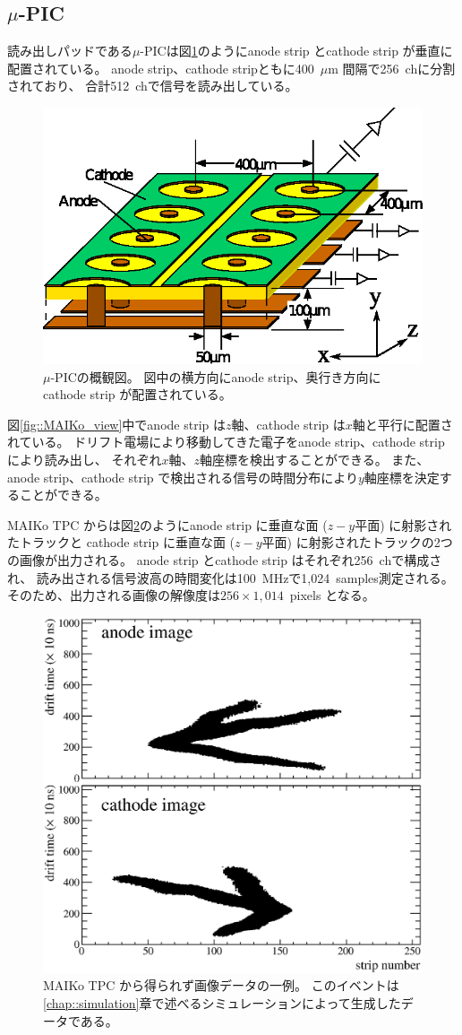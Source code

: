 \subsection{$\mu$-PIC}
読み出しパッドである$\mu$-PICは図\ref{fig::mupic}のようにanode strip とcathode strip が垂直に配置されている。
anode strip、cathode stripともに400~$\mu$m 間隔で256~chに分割されており、
合計512~chで信号を読み出している。
\begin{figure}
  \centering
  \includegraphics[clip, width=0.7\columnwidth]{eps/upic_struc_xyz.eps}
  \caption[$\mu$-PICの概観図。]{$\mu$-PICの概観図。
    図中の横方向にanode strip、奥行き方向にcathode strip が配置されている。
  }
  \label{fig::mupic}
\end{figure}
図\ref{fig::MAIKo_view}中でanode strip は$z$軸、cathode strip は$x$軸と平行に配置されている。
ドリフト電場により移動してきた電子をanode strip、cathode strip により読み出し、
それぞれ$x$軸、$z$軸座標を検出することができる。
また、anode strip、cathode strip で検出される信号の時間分布により$y$軸座標を決定することができる。

MAIKo TPC からは図\ref{fig::track_demo}のようにanode strip に垂直な面 ($z-y$平面) に射影されたトラックと
cathode strip に垂直な面 ($z-y$平面) に射影されたトラックの2つの画像が出力される。
anode strip とcathode strip はそれぞれ256~chで構成され、
読み出される信号波高の時間変化は100~MHzで1,024~samples測定される。
そのため、出力される画像の解像度は$256\times1,014$~pixels となる。
\begin{figure}
  \centering
  \includegraphics[clip, width=0.7\columnwidth]{eps/10016_6.eps}
  \caption[MAIKo TPC から得られず画像データの一例。]
          {MAIKo TPC から得られず画像データの一例。
          このイベントは\ref{chap::simulation}章で述べるシミュレーションによって生成したデータである。}
  \label{fig::track_demo}
\end{figure}

